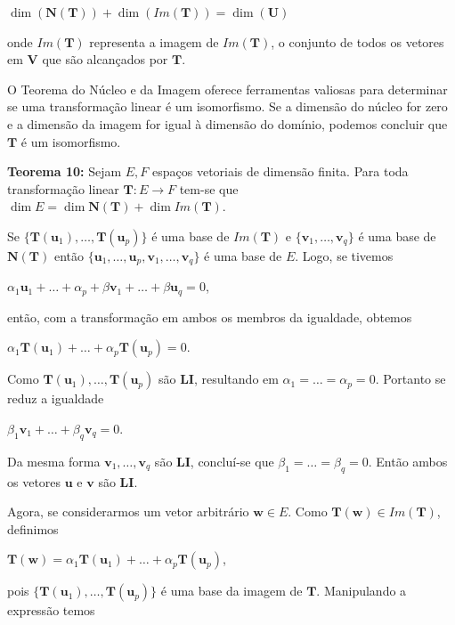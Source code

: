 \centerline{$\dim(\mathbf{N}(\mathbf{T})) + \dim(Im(\mathbf{T})) = \dim(\mathbf{U})$}

\noindent onde $Im(\mathbf{T})$ representa a imagem de $Im(\mathbf{T})$, o conjunto de todos os vetores em $\mathbf{V}$ que são alcançados por $\mathbf{T}$.

O Teorema do Núcleo e da Imagem oferece ferramentas valiosas para determinar se uma transformação linear é um isomorfismo. Se a dimensão do núcleo for zero e a dimensão da imagem for igual à dimensão do domínio, podemos concluir que $\mathbf{T}$ é um isomorfismo.

\noindent\textbf{Teorema 10:} Sejam $E, F$ espaços vetoriais de dimensão finita. Para toda transformação linear $\mathbf{T}: E \longrightarrow F$ tem-se que $\dim E = \dim \mathbf{N}(\mathbf{T}) + \dim Im(\mathbf{T})$.

Se $\{\mathbf{T}(\mathbf{u}_1), \ldots, \mathbf{T}(\mathbf{u}_p)\}$ é uma base de $Im(\mathbf{T})$ e $\{\mathbf{v}_1, \ldots, \mathbf{v}_q\}$ é uma base de $\mathbf{N}(\mathbf{T})$ então $\{\mathbf{u}_1, \ldots, \mathbf{u}_p, \mathbf{v}_1, \ldots, \mathbf{v}_q\}$ é uma base de $E$. Logo, se tivemos

\centerline{$\alpha_1\mathbf{u}_1 + \ldots + \alpha_p + \beta\mathbf{v}_1 + \ldots + \beta\mathbf{u}_q = 0$,}

então, com a transformação em ambos os membros da igualdade, obtemos

\centerline{$\alpha_1\mathbf{T}(\mathbf{u}_1) + \ldots + \alpha_p\mathbf{T}(\mathbf{u}_p) = 0$.}

Como $\mathbf{T}(\mathbf{u}_1), \ldots, \mathbf{T}(\mathbf{u}_p)$ são \textbf{LI}, resultando em $\alpha_1 = \ldots = \alpha_p = 0$. Portanto se reduz a igualdade

\centerline{$\beta_1\mathbf{v}_1 + \ldots + \beta_q\mathbf{v}_q = 0$.}

Da mesma forma $\mathbf{v}_1, \ldots, \mathbf{v}_q$ são \textbf{LI}, concluí-se que $\beta_1 = \ldots = \beta_q = 0$. Então ambos os vetores $\mathbf{u}$ e $\mathbf{v}$ são \textbf{LI}.

Agora, se considerarmos um vetor arbitrário $\mathbf{w} \in E$. Como $\mathbf{T}(\mathbf{w}) \in Im(\mathbf{T})$, definimos

\centerline{$\mathbf{T}(\mathbf{w}) = \alpha_1\mathbf{T}(\mathbf{u}_1) + \ldots + \alpha_p\mathbf{T}(\mathbf{u}_p)$,}

pois $\{\mathbf{T}(\mathbf{u}_1), \ldots, \mathbf{T}(\mathbf{u}_p)\}$ é uma base da imagem de $\mathbf{T}$. Manipulando a expressão temos

